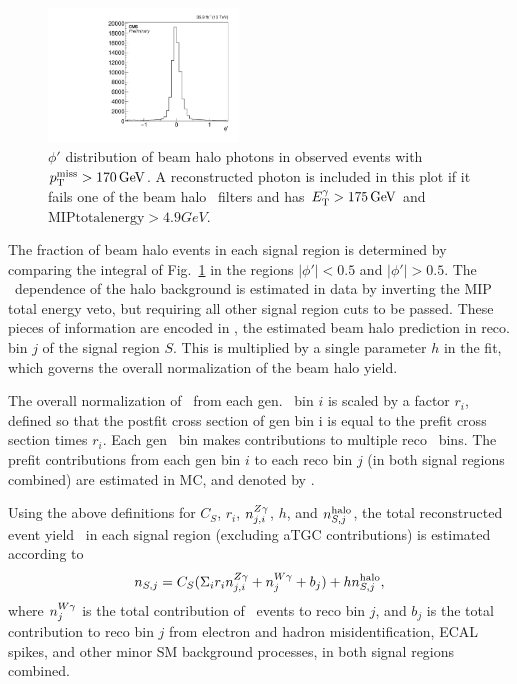 \begin{figure}[tbp]
  \begin{center}
    \includegraphics[width=0.45\textwidth]{figures/noncol/phiHaloFolded.pdf}
    \caption{
      $\phi'$ distribution of beam halo photons in observed events with $\MET > 170\unit{GeV}$. A reconstructed photon is included
      in this plot if it fails one of the beam halo \MET\ filters and has $\ETgamma > 175\unit{GeV}$ and
      $\mathrm{MIP total energy}>4.9\unit{GeV}$.
    }
    \label{fig:halophi}
  \end{center}
\end{figure}

The fraction of beam halo events in each signal region is determined by comparing the integral of Fig.~\ref{fig:halophi} in the regions
$|\phi'| < 0.5$ and $|\phi'| > 0.5$. The \ETgamma\ dependence of the halo background is estimated in data
by inverting the MIP total energy veto, but requiring all other signal region cuts to be passed. These pieces of information are encoded in 
\nhalo[,j], the estimated beam halo prediction in reco. bin $j$ of the signal region $S$. This is multiplied by a
single parameter $h$ in the fit, which governs the overall normalization of the beam halo yield.

The overall normalization of \zinvg\ from each gen. \pTgamma\ bin $i$ is scaled by a factor $r_{i}$, defined so that
the postfit cross section of gen bin i is equal to the prefit cross section times $r_{i}$.
Each gen \pTgamma\ bin makes contributions to multiple reco \ETgamma\ bins.
The prefit contributions from each gen bin $i$ to each reco bin $j$ (in both signal regions combined) are estimated in MC, and denoted by \nZg[j,i].

Using the above definitions for $C_{S}$, $r_{i}$, $\nZg[j,i]$, $h$, and $\nhalo[,j]$,
the total reconstructed event yield \nS\ in each signal region (excluding aTGC contributions) is estimated according to
\begin{equation}
  \nS[,j] = C_{S} (\Sigma_{i}r_{i}\nZg[j,i] + \nWg[j] + b_{j}) + h\nhalo[,j],
\end{equation}
where $\nWg[j]$ is the total contribution of \wlng\ events to reco bin $j$, and $b_{j}$ is the total contribution to reco bin $j$ from
electron and hadron misidentification, ECAL spikes, and other minor SM background processes, in both signal regions combined.

